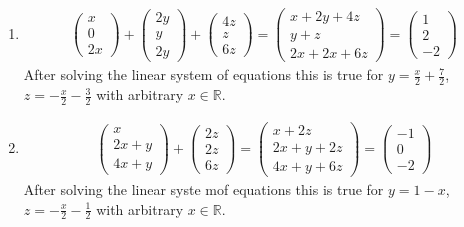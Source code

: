 \documentclass{article}
\begin{document}
\begin{enumerate}
    \item \begin{align*}
        \begin{pmatrix}
            x \\ 0 \\ 2x
        \end{pmatrix} + \begin{pmatrix}
            2y \\ y \\ 2y
        \end{pmatrix} + \begin{pmatrix}
            4z \\ z \\ 6z
        \end{pmatrix} = \begin{pmatrix}
            x + 2y + 4z \\ y + z \\ 2x + 2x + 6z
        \end{pmatrix} = \begin{pmatrix}
            1 \\ 2 \\ -2
        \end{pmatrix}
    \end{align*}
    After solving the linear system of equations this is true for $y = \frac{x}{2} + \frac{7}{2}$, $z = -\frac{x}{2} - \frac{3}{2}$ with arbitrary $x \in \mathbb{R}$.

    \item \begin{align*}
        \begin{pmatrix}
            x \\ 2x + y \\ 4x + y
        \end{pmatrix} + \begin{pmatrix}
            2z \\ 2z \\ 6z
        \end{pmatrix} = \begin{pmatrix}
            x + 2z \\ 2x + y + 2z \\ 4x + y + 6z
        \end{pmatrix} = \begin{pmatrix}
            -1 \\ 0 \\ -2
        \end{pmatrix}
    \end{align*}
    After solving the linear syste mof equations this is true for $y = 1 - x$, $z = -\frac{x}{2} - \frac{1}{2}$ with arbitrary $x \in \mathbb{R}$.
\end{enumerate}
\end{document}
